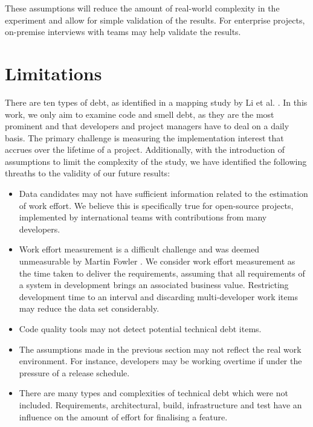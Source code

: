 These assumptions will reduce the amount of real-world complexity in the
experiment and allow for simple validation of the results. For enterprise
projects, on-premise interviews with teams may help validate the results.

\section{Limitations}
\label{limitations}

There are ten types of debt, as identified in a mapping study by Li et al.
\cite{Li2015}. In this work, we only aim to examine code and smell debt, as they
are the most prominent and that developers and project managers have to deal on
a daily basis. The primary challenge is measuring the implementation interest
that accrues over the lifetime of a project. Additionally, with the introduction
of assumptions to limit the complexity of the study, we have identified the
following threaths to the validity of our future results:

\begin{itemize}
	\item Data candidates may not have sufficient information related to the
	      estimation of work effort. We believe this is specifically true for
	      open-source projects, implemented by international teams with
	      contributions from many developers.
	\item Work effort measurement is a difficult challenge and was deemed
	      unmeasurable by Martin Fowler \cite{CannotMeasureProductivity}. We
	      consider work effort measurement as the time taken to deliver the
	      requirements, assuming that all requirements of a system in
	      development brings an associated business value. Restricting
	      development time to an interval and discarding multi-developer work
	      items may reduce the data set considerably.
	\item Code quality tools may not detect potential technical debt items.
	\item The assumptions made in the previous section may not reflect the
	      real work environment. For instance, developers may be working
	      overtime if under the pressure of a release schedule.
	\item There are many types and complexities of technical debt which were not
	      included. Requirements, architectural, build, infrastructure and test
	      have an influence on the amount of effort for finalising a feature.
\end{itemize}

